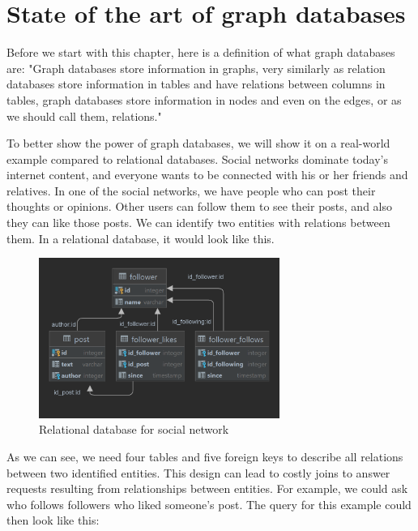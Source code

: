 \chapter {State of the art of graph databases}

Before we start with this chapter, here is a definition of what graph databases are:
"Graph databases store information in graphs, very similarly as relation databases store information in tables and have relations between columns in tables,
graph databases store information in nodes and even on the edges, or as we should call them, relations." \cite{morgante_what_2021}

To better show the power of graph databases, we will show it on a real-world example compared to relational databases.
Social networks dominate today's internet content, and everyone wants to be connected with his or her friends and relatives.
In one of the social networks, we have people who can post their thoughts or opinions.
Other users can follow them to see their posts, and also they can like those posts.
We can identify two entities with relations between them.
In a relational database, it would look like this.

\begin{figure}[H]
    \centering
    \includegraphics[width=0.7\textwidth]{content/relational-dbms-social-network.png}
    \caption{Relational database for social network}
\end{figure}

As we can see, we need four tables and five foreign keys to describe all relations between two identified entities.
This design can lead to costly joins to answer requests resulting from relationships between entities. For example, we could ask who follows followers who liked someone's post. The query for this example could then look like this:

